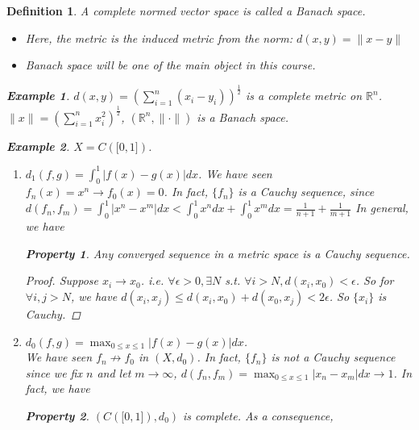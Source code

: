 \documentclass{article}
\newtheorem*{property}{Property}
\newtheorem*{definition}{Definition}
\newtheorem*{example}{Example}
\begin{document}
\begin{definition}
    A complete normed vector space is called a Banach space.
    \begin{itemize}
        \item Here, the metric is the induced metric from the norm: $d(x, y) = \|x - y\|$
        \item Banach space will be one of the main object in this course.
    \end{itemize}
    \begin{example}
        $d(x, y) = (\sum_{i=1}^{n}{(x_i-y_i)})^\frac{1}{2}$ is a complete metric on $\mathbb{R}^n$.\\
        $\|x\|=(\sum_{i=1}^{n}{x_i^2})^\frac{1}{2}$, $(\mathbb{R}^n, \|\cdot\|)$ is a Banach space.
    \end{example}
    \begin{example}
        $X=C(\bigl[0, 1\bigr])$.
        \begin{enumerate}
            \item $d_1(f, g) = \int_{0}^{1}{|f(x) - g(x)|dx}$.
            We have seen $f_n(x) = x^n \rightarrow f_0(x) = 0$.
            In fact, $\{f_n\}$ is a Cauchy sequence, since
            $d(f_n, f_m) = \int_{0}^{1}|x^n - x^m|dx < \int_{0}^{1}{x^ndx} + \int_{0}^{1}{x^mdx}=\frac{1}{n+1} + \frac{1}{m+1}$
            In general, we have
            \begin{property}
                Any converged sequence in a metric space is a Cauchy sequence.
                \begin{proof}
                    Suppose $x_i \rightarrow x_0$. i.e. $\forall \epsilon > 0, \exists N$ s.t.
                    $\forall i > N, d(x_i, x_0) < \epsilon$.
                    So for $\forall i, j > N$, we have
                    $d(x_i, x_j) \le d(x_i, x_0) + d(x_0, x_j) < 2\epsilon$.
                    So $\{x_i\}$ is Cauchy.
                \end{proof}
            \end{property}
            \item $d_0(f, g) = \max_{0 \le x \le 1}{|f(x) - g(x)|dx}$.\\
            We have seen $f_n \not\rightarrow f_0$ in $(X, d_0)$.
            In fact, $\{f_n\}$ is not a Cauchy sequence since we fix $n$ and let $m \rightarrow \infty$,
            $d(f_n, f_m) = \max_{0 \le x \le 1}{|x_n - x_m|dx} \rightarrow 1$.
            In fact, we have 
            \begin{property}
                $(C(\bigl[0, 1\bigr]), d_0)$ is complete. As a consequence, \\

\end{property}
\end{enumerate}
\end{example}
\end{definition}
\end{document}
